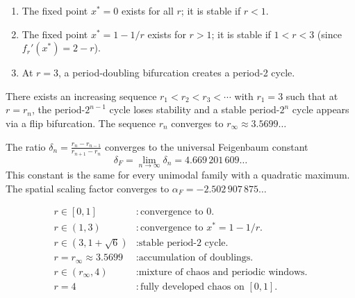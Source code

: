 \begin{proposition}
\begin{enumerate}
    \item The fixed point $x^* = 0$ exists for all $r$; it is stable if $r < 1$.
    \item The fixed point $x^* = 1 - 1/r$ exists for $r > 1$; it is stable if
    $1 < r < 3$ (since $f_r'(x^*) = 2 - r$).
    \item At $r = 3$, a period-doubling bifurcation creates a period-2 cycle.
\end{enumerate}
\end{proposition}

\begin{theorem}
There exists an increasing sequence $r_1 < r_2 < r_3 < \cdots$ with $r_1 = 3$
such that at $r = r_n$, the period-$2^{n-1}$ cycle loses stability and a
stable period-$2^n$ cycle appears via a flip bifurcation. The sequence $r_n$
converges to $r_\infty \approx 3.5699\ldots$
\end{theorem}

\begin{theorem}
The ratio $\delta_n = \frac{r_n - r_{n-1}}{r_{n+1} - r_n}$ converges to the
universal Feigenbaum constant
\[
    \delta_F = \lim_{n \to \infty} \delta_n = 4.669\,201\,609\ldots
\]
This constant is the same for every unimodal family with a quadratic maximum.
The spatial scaling factor converges to $\alpha_F = -2.502\,907\,875\ldots$
\end{theorem}

\begin{keyformulas}[title=\textbf{Regimes of the Logistic Map}]
\begin{align*}
    r \in [0, 1] &: \text{convergence to } 0. \\
    r \in (1, 3) &: \text{convergence to } x^* = 1 - 1/r. \\
    r \in (3, 1{+}\sqrt{6}) &: \text{stable period-2 cycle.} \\
    r = r_\infty \approx 3.5699 &: \text{accumulation of doublings.} \\
    r \in (r_\infty, 4) &: \text{mixture of chaos and periodic windows.} \\
    r = 4 &: \text{fully developed chaos on } [0, 1].
\end{align*}
\end{keyformulas}

